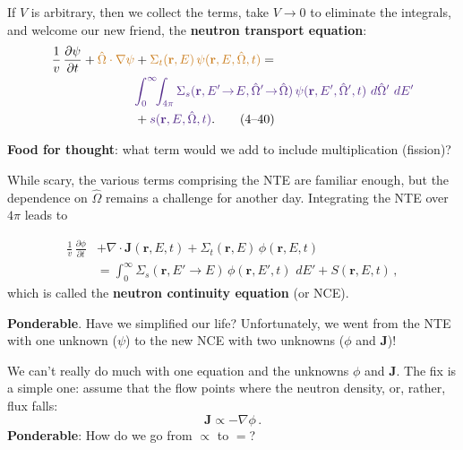 \documentclass[compact]{ne630handout}
\newcommand{\br}{\mathbf{r}}
\newcommand{\bO}{\hat{\Omega}}
\newcommand{\JJ}{\mathbf{J}}
\newcommand{\flux}{\phi}
\newcommand{\angflux}{\psi}
\newcommand{\dE}{\,dE}
\newcommand{\dO}{\,d\hat{\Omega}}
\begin{document}
\begin{handoutflow}


If $V$ is arbitrary, then we collect the terms, take $V \to 0$ to eliminate the integrals,
and welcome our new friend, the {\bf neutron transport equation}:
\begin{align*}
  \frac{1}{v}\,\frac{\partial \angflux}{\partial t}
  +  \textcolor{wcalerted}{ \bO\cdot\nabla \angflux}
  &+   \textcolor{wcalerted}{ \Sigma_t(\br,E)\, \angflux(\br,E,\bO,t)}
   = \\
  & \textcolor{wcprimary}{\int_0^\infty \!\!\int_{4\pi}
  \Sigma_s(\br, E'\!\to\!E, \bO'\!\to\!\bO)\,
  \angflux(\br,E',\bO',t)\, \dO'\, \dE'} \\
  & + \textcolor{wcprimary}{ s(\br,E,\bO,t) }.
  \tag{4--40}
\end{align*}


{\bf Food for thought}: what term would we add to include multiplication (fission)?


\Sec{8}{Eliminating $\bO$}

While scary, the various terms comprising the NTE are familiar enough, but the dependence on $\bO$ remains a challenge for another day.  Integrating the NTE over $4 \pi$ leads to

\begin{align*}
  \frac{1}{v}\,\frac{\partial \flux}{\partial t}
  &+ \nabla\!\cdot\! \JJ(\br,E,t)
   +\Sigma_t(\br,E)\, \flux(\br,E,t)\\
  &=
  \int_0^\infty \Sigma_s(\br, E'\!\to\!E)\, \flux(\br,E',t)\, \dE'
  + S(\br,E,t) \, ,
  \tag{4--79}
\end{align*}
which is called the {\bf neutron continuity equation} (or NCE).




{\bf Ponderable}.  Have we simplified our life?
Unfortunately, we went from the NTE with one unknown ($\psi$) to the new NCE
with two unknowns ($\phi$ and $\mathbf{J}$)!



We can't really do much with one equation and the unknowns $\phi$ and $\mathbf{J}$.
The fix is a simple one: assume that the flow points where the neutron density, or,
rather, flux falls:
\begin{equation*}
   \mathbf{J} \propto -\nabla \phi \, .
\end{equation*}
{\bf Ponderable}: How do we go from $\propto$ to $=$?


\end{handoutflow}
\end{document}
